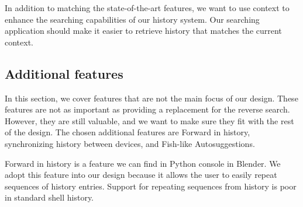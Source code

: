 

In addition to matching the state-of-the-art features, we want to use context to enhance the searching capabilities of our history system. Our searching application should make it easier to retrieve history that matches the current context. 





\subsection{Additional features}

In this section, we cover features that are not the main focus of our design. These features are not as important as providing a replacement for the reverse search. However, they are still valuable, and we want to make sure they fit with the rest of the design. 
The chosen additional features are Forward in history, synchronizing history between devices, and Fish-like Autosuggestions.




Forward in history is a feature we can find in Python console in Blender. We adopt this feature into our design because it allows the user to easily repeat sequences of history entries. Support for repeating sequences from history is poor in standard shell history.


